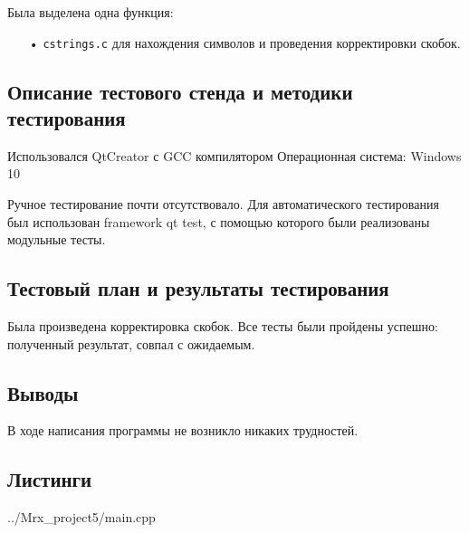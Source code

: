 \documentclass[12pt,a4paper]{report}
\begin{document}
Была выделена одна функция:
\begin{enumerate}
\item[•] \verb-сstrings.c- для нахождения символов и проведения корректировки скобок.
\end{enumerate}

\subsection{Описание тестового стенда и методики тестирования}
Использовался QtCreator с GCC компилятором
Операционная система: Windows 10


Ручное тестирование почти отсутствовало.
Для автоматического тестирования был использован framework qt test, с помощью которого были реализованы модульные тесты.

\subsection{Тестовый план и результаты тестирования}

Была произведена корректировка скобок. Все тесты были пройдены успешно: полученный результат, совпал с ожидаемым.



\subsection{Выводы}

В ходе написания программы не возникло никаких трудностей.

\subsection*{Листинги}

{../Mrx_project5/main.cpp}
\end{document}
